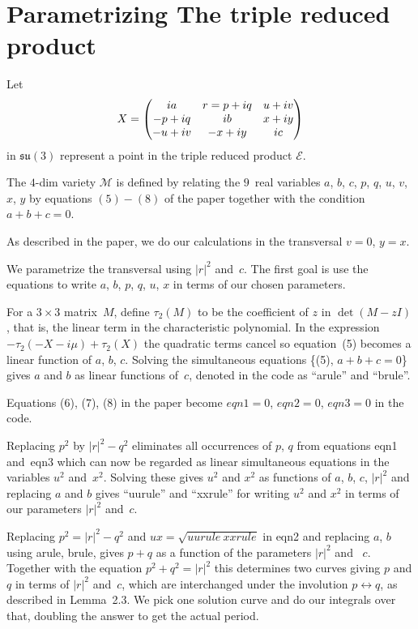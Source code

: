 \documentclass[12pt]{amsart}
\begin{document}
\section{Parametrizing The triple  reduced product}
Let
$$X=
\begin{pmatrix}
ia &r=p+iq&u+iv\cr
-p+iq&ib&x+iy\cr
-u+iv&-x+iy&ic\cr
\end{pmatrix}$$
in $\mathfrak{su}(3)$ represent a point in the triple reduced product ${\mathcal E}$.

The $4$-dim variety ${\mathcal M}$ is defined by relating the $9$~real variables
$a$, $b$, $c$, $p$, $q$, $u$, $v$, $x$, $y$ by equations $(5)-(8)$ of the paper
together with the condition $a+b+c=0$.

As described in the paper, we do our calculations in the transversal $v=0$, $y=x$.

We parametrize the transversal using $|r|^2$ and~$c$.
The first goal is use the equations to write $a$, $b$, $p$, $q$, $u$, $x$ in terms of our
chosen parameters.

For a $3\times 3$ matrix~$M$, define $\tau_2(M)$ to be the coefficient of $z$ in
$\det(M-z I)$, that is, the linear term in the characteristic polynomial.
In the expression $-\tau_2(-X-i\mu)+\tau_2(X)$ the quadratic terms cancel so equation~(5)
becomes a linear function of $a$, $b$, $c$.
Solving the simultaneous equations \{(5), $a+b+c=0$\} gives $a$ and $b$ as linear functions
of~$c$, denoted in the code as ``arule'' and ``brule''.

Equations (6), (7), (8) in the paper become $eqn1=0$, $eqn2=0$, $eqn3=0$ in the code.

Replacing $p^2$ by $|r|^2-q^2$ eliminates all occurrences of $p$, $q$ from equations eqn1
and~eqn3 which can now be regarded as linear simultaneous equations in the variables $u^2$
and~$x^2$.
Solving these gives $u^2$ and $x^2$ as functions of $a$, $b$, $c$, $|r|^2$ and replacing
$a$ and $b$ gives ``uurule'' and ``xxrule'' for writing $u^2$ and $x^2$ in terms of our
parameters $|r|^2$ and~$c$.

Replacing $p^2 = |r|^2-q^2$ and $ux = \sqrt{uurule\ xxrule}$ in eqn2 and replacing $a$, $b$
using arule, brule, gives $p+q$ as a function of the parameters $|r|^2$ and ~$c$.
Together with the equation $p^2+q^2=|r|^2$ this determines two curves giving $p$ and $q$
in terms of $|r|^2$ and~$c$, which are interchanged under the involution $p\leftrightarrow q$,
as described in Lemma~2.3.
We pick one solution curve and do our integrals over that, doubling the answer to get
the actual period.
\end{document}
